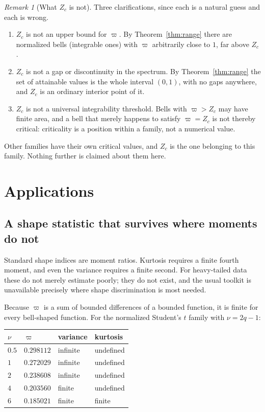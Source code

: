 \documentclass[11pt]{article}
\theoremstyle{definition}
\theoremstyle{plain}
\theoremstyle{remark}
\newtheorem{remark}[definition]{Remark}
\begin{document}
\begin{remark}[What $Z_c$ is not]\label{rem:zcnot}
Three clarifications, since each is a natural guess and each is wrong.
\begin{enumerate}
  \item $Z_c$ is not an upper bound for $\varpi$. By Theorem~\ref{thm:range} there
        are normalized bells (integrable ones) with $\varpi$ arbitrarily close to
        $1$, far above $Z_c$.
  \item $Z_c$ is not a gap or discontinuity in the spectrum. By
        Theorem~\ref{thm:range} the set of attainable values is the whole interval
        $(0,1)$, with no gaps anywhere, and $Z_c$ is an ordinary interior point of it.
  \item $Z_c$ is not a universal integrability threshold. Bells with
        $\varpi>Z_c$ may have finite area, and a bell that merely happens to satisfy
        $\varpi=Z_c$ is not thereby critical: criticality is a position within a family,
        not a numerical value.
\end{enumerate}
Other families have their own critical values, and $Z_c$ is the one belonging to this
family. Nothing further is claimed about them here.
\end{remark}

 
\section{Applications}\label{sec:applications}
 

\subsection{A shape statistic that survives where moments do not}

Standard shape indices are moment ratios. Kurtosis requires a finite fourth moment, and
even the variance requires a finite second. For heavy-tailed data these do not merely estimate poorly; they do not exist, and the usual toolkit is
unavailable precisely where shape discrimination is most needed.

Because $\varpi$ is a sum of bounded differences of a bounded function, it is finite for
every bell-shaped function. For the normalized Student's $t$ family with $\nu=2q-1$:

\begin{center}
\begin{tabular}{@{}llll@{}}
\toprule
$\nu$ & $\varpi$ & variance & kurtosis\\
\midrule
$0.5$ & $0.298112$ & infinite & undefined\\
$1$   & $0.272029$ & infinite & undefined\\
$2$   & $0.238608$ & infinite & undefined\\
$4$   & $0.203560$ & finite   & undefined\\
$6$   & $0.185021$ & finite   & finite\\
\bottomrule
\end{tabular}
\end{center}
\end{document}
